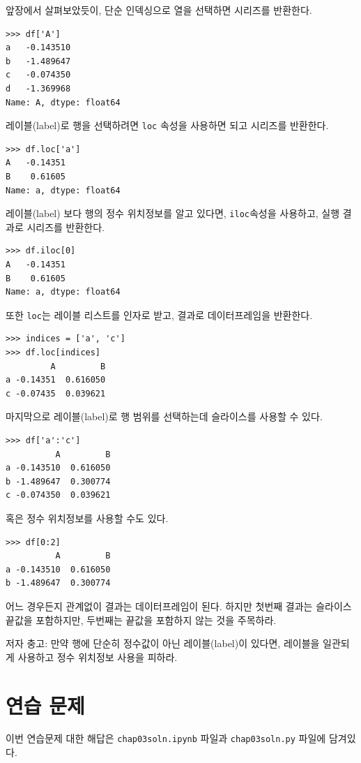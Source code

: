 앞장에서 살펴보았듯이, 단순 인덱싱으로 열을 선택하면 시리즈를 반환한다.


\begin{verbatim}
>>> df['A']
a   -0.143510
b   -1.489647
c   -0.074350
d   -1.369968
Name: A, dtype: float64
\end{verbatim}

레이블(label)로 행을 선택하려면 {\tt loc} 속성을 사용하면 되고 시리즈를 반환한다.  

\begin{verbatim}
>>> df.loc['a']
A   -0.14351
B    0.61605
Name: a, dtype: float64
\end{verbatim}

레이블(label) 보다 행의 정수 위치정보를 알고 있다면, {\tt iloc}속성을 사용하고, 실행 결과로 시리즈를 반환한다.

\begin{verbatim}
>>> df.iloc[0]
A   -0.14351
B    0.61605
Name: a, dtype: float64
\end{verbatim}

또한 {\tt loc}는 레이블 리스트를 인자로 받고, 결과로 데이터프레임을 반환한다.

\begin{verbatim}
>>> indices = ['a', 'c']
>>> df.loc[indices]
         A         B
a -0.14351  0.616050
c -0.07435  0.039621
\end{verbatim}

마지막으로 레이블(label)로 행 범위를 선택하는데 슬라이스를 사용할 수 있다.

\begin{verbatim}
>>> df['a':'c']
          A         B
a -0.143510  0.616050
b -1.489647  0.300774
c -0.074350  0.039621
\end{verbatim}

혹은 정수 위치정보를 사용할 수도 있다.

\begin{verbatim}
>>> df[0:2]
          A         B
a -0.143510  0.616050
b -1.489647  0.300774
\end{verbatim}

어느 경우든지 관계없이 결과는 데이터프레임이 된다. 하지만 첫번째 결과는 슬라이스 끝값을 포함하지만, 두번째는 끝값을 포함하지 않는 것을 주목하라.

저자 충고: 만약 행에 단순히 정수값이 아닌 레이블(label)이 있다면, 레이블을 일관되게 사용하고 정수 위치정보 사용을 피하라.


\section{연습 문제}
이번 연습문제 대한 해답은 \verb"chap03soln.ipynb" 파일과 
\verb"chap03soln.py" 파일에 담겨있다.

